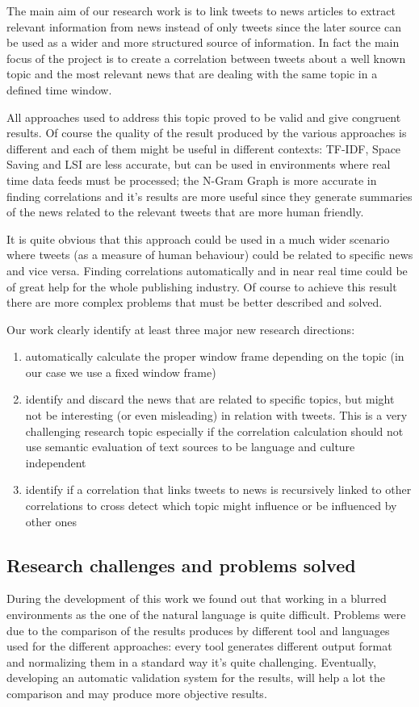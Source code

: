 The main aim of our research work is to link tweets to news articles to extract relevant information from news 
instead of only tweets since the later source can be used as a wider and more structured source of information. 
In fact the main focus of the project is to create a correlation between tweets about a well known topic and 
the most relevant news that are dealing with the same topic in a defined time window.
 
All approaches used to address this topic proved to be valid and give congruent results. 
Of course the quality of the result produced by the various approaches is different and each of them
might be useful in different contexts: TF-IDF, Space Saving and LSI  are less accurate, but can be used in environments where 
real time data feeds must be processed; the N-Gram Graph is more accurate in finding correlations and it's 
results are more useful since they generate summaries of the news related to the relevant tweets that are
more human friendly. 

It is quite obvious that this approach could be used in a much wider scenario where tweets (as a measure of 
human behaviour) could be related to specific news and vice versa. Finding correlations automatically and 
in near real time could be of great help for the whole publishing industry. Of course to achieve this result there 
are more complex problems that must be better described and solved.

Our work clearly identify at least three major new research directions:
\begin{enumerate}
	\item automatically calculate the proper window frame depending on the topic (in our case we use a fixed window frame)
	\item identify and discard the news that are related to specific topics, but might not be interesting (or even misleading) in relation with tweets. This is a very challenging research topic especially if the correlation calculation should not use semantic evaluation of text sources to be language and culture  independent 
	\item identify if a correlation that links tweets to news is recursively linked to other correlations to cross detect which topic might influence or be influenced by other ones
\end{enumerate}

\subsection*{Research challenges and problems solved}
During the development of this work we found out that working in a blurred environments as the one of the natural language is quite difficult.
Problems were due to the comparison of the results produces by different tool and languages used for the different approaches: every tool generates different output format and normalizing them in a standard way it's quite challenging. 
Eventually, developing an automatic validation system for the results, will help a lot the comparison and may produce more objective results.


